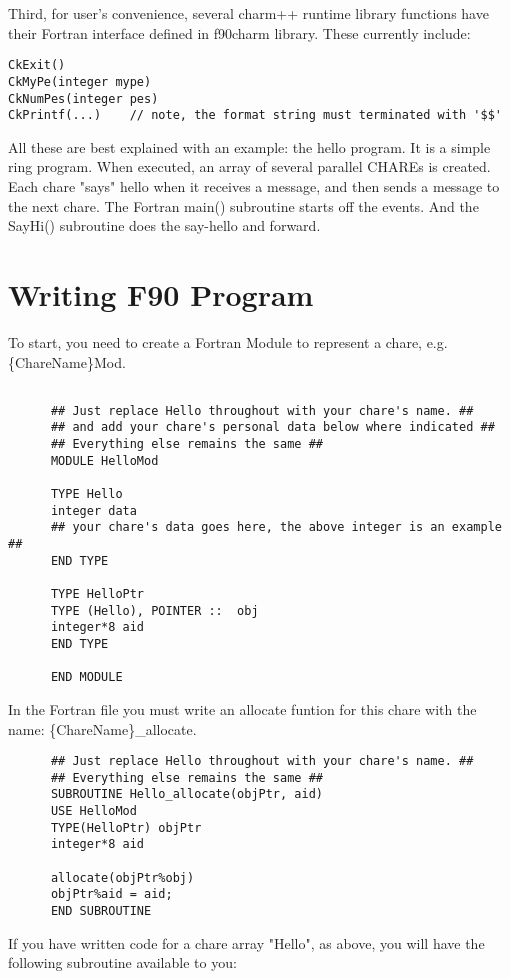 \documentclass[11pt]{article}
\begin{document}
Third, for user's convenience, several charm++ runtime library functions
have their Fortran interface defined in f90charm library. These currently
include:
\begin{verbatim}
CkExit()
CkMyPe(integer mype)
CkNumPes(integer pes)
CkPrintf(...)    // note, the format string must terminated with '$$'
\end{verbatim}

All these are best explained with an example: the hello program.  It is a
simple ring program.  When executed, an array of several parallel
CHAREs is created.  Each chare "says" hello when it receives a
message, and then sends a message to the next chare.  The Fortran main() 
subroutine starts off the events.  And the SayHi() subroutine does the 
say-hello and forward.

\section{Writing F90 Program}
To start, you need to create a Fortran Module to represent a chare,
e.g. \{ChareName\}Mod.

\begin{verbatim}

      ## Just replace Hello throughout with your chare's name. ##
      ## and add your chare's personal data below where indicated ##
      ## Everything else remains the same ##
      MODULE HelloMod

      TYPE Hello
      integer data
      ## your chare's data goes here, the above integer is an example ##
      END TYPE

      TYPE HelloPtr
      TYPE (Hello), POINTER ::  obj
      integer*8 aid
      END TYPE

      END MODULE
\end{verbatim}

In the Fortran file you must write an allocate funtion for this chare
with the name: \{ChareName\}\_allocate.

\begin{verbatim}
      ## Just replace Hello throughout with your chare's name. ##
      ## Everything else remains the same ##
      SUBROUTINE Hello_allocate(objPtr, aid)
      USE HelloMod
      TYPE(HelloPtr) objPtr 
      integer*8 aid

      allocate(objPtr%obj)
      objPtr%aid = aid;
      END SUBROUTINE
\end{verbatim}

If you have written code for a chare array "Hello", as above, you will
have the following subroutine available to you:
\end{document}
